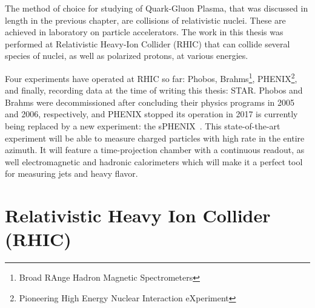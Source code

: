 The method of choice for studying of Quark-Gluon Plasma, that was discussed in length in the previous chapter, are collisions of relativistic nuclei. These are achieved in laboratory on particle accelerators. The work in this thesis was performed at Relativistic Heavy-Ion Collider (RHIC) that can collide several species of nuclei, as well as polarized protons, at various energies. 


Four experiments have operated at RHIC so far: Phobos, Brahms\footnote{Broad RAnge Hadron Magnetic Spectrometers}, PHENIX\footnote{Pioneering High Energy Nuclear Interaction eXperiment}, and finally, recording data at the time of writing this thesis: STAR. Phobos and Brahms were decommissioned after concluding their physics programs in 2005 and 2006, respectively, and PHENIX stopped its operation in 2017 is currently being replaced by a new experiment: the sPHENIX~\cite{sphenix}. This state-of-the-art experiment will be able to measure charged particles with high rate in the entire azimuth. It will feature a time-projection chamber with a continuous readout, as well electromagnetic and hadronic calorimeters which will make it a perfect tool for measuring jets and heavy flavor.


\section{Relativistic Heavy Ion Collider (RHIC)\label{RHIC}}

